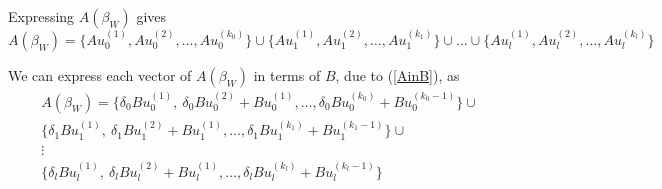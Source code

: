 Expressing $A(\beta_W)$ gives
\begin{equation}
A(\beta_W)=\{Au_{0}^{(1)},Au_{0}^{(2)},\dots,Au_{0}^{(k_0)}\} \cup \{Au_{1}^{(1)},Au_{1}^{(2)},\dots,Au_{1}^{(k_1)}\} \cup \dots \cup \{Au_{l}^{(1)},Au_{l}^{(2)},\dots,Au_{l}^{(k_l)}\}
 \end{equation}

We can express each vector of $A(\beta_W)$ in terms of $B$, due to (\ref{AinB}), as
\begin{align*}
A(\beta_W)=\{\delta_0 Bu_{0}^{(1)},\ \delta_0 Bu_{0}^{(2)}+Bu_{0}^{(1)},\dots,\delta_0 Bu_{0}^{(k_0)}+Bu_{0}^{(k_0-1)}\} \cup\\
\{\delta_1 Bu_{1}^{(1)},\ \delta_1Bu_{1}^{(2)}+Bu_{1}^{(1)},\dots,\delta_1 Bu_{1}^{(k_1)}+Bu_{1}^{(k_1-1)}\} \cup\\
\vdots\\
\{\delta_l Bu_{l}^{(1)},\ \delta_lBu_{l}^{(2)}+Bu_{l}^{(1)},\dots,\delta_l Bu_{l}^{(k_l)}+Bu_{l}^{(k_l-1)}\}\quad
 \end{align*}

